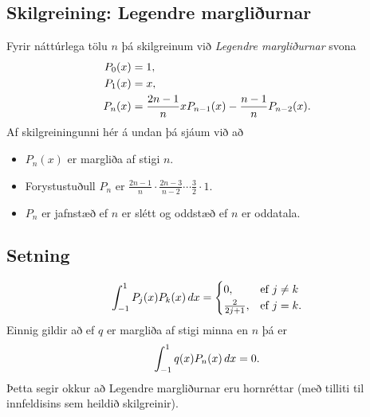 \documentclass[A4paper,10pt,icelandic]{sphinxmanual}
\begin{document}
\subsection{Skilgreining: Legendre margliðurnar}
\label{kafli03:index-17}\label{kafli03:skilgreining-legendre-margliurnar}
Fyrir náttúrlega tölu \(n\) þá skilgreinum við
\emph{Legendre margliðurnar} svona
\begin{gather}
\begin{split}\begin{aligned}
   P_0(x) &= 1,\\
   P_1(x) &= x,\\
   P_n(x) &= \frac{2n-1}n x P_{n-1}(x) - \frac{n-1}n P_{n-2}(x).
  \end{aligned}\end{split}\notag
\end{gather}
Af skilgreiningunni hér á undan þá sjáum við að
\begin{itemize}
\item {} 
\(P_n(x)\) er margliða af stigi \(n\).

\item {} 
Forystustuðull \(P_n\) er
\(\frac {2n-1}n \cdot \frac {2n-3}{n-2} \cdots \frac 32 \cdot 1\).

\item {} 
\(P_n\) er jafnstæð ef \(n\) er slétt og oddstæð ef \(n\)
er oddatala.

\end{itemize}


\subsection{Setning}
\label{kafli03:id5}\begin{gather}
\begin{split}\int_{-1}^1 P_j(x) P_k(x)\, dx =
    \begin{cases}
     0, & \text{ef } j\neq k\\
     \frac{2}{2j+1}, & \text{ef } j=k.
    \end{cases}\end{split}\notag
\end{gather}
Einnig gildir að ef \(q\) er margliða af stigi minna en \(n\) þá er
\begin{gather}
\begin{split}\int_{-1}^1 q(x)P_n(x)\, dx = 0.\end{split}\notag
\end{gather}
Þetta segir okkur að Legendre margliðurnar eru hornréttar (með tilliti
til innfeldisins sem heildið skilgreinir).
\end{document}
